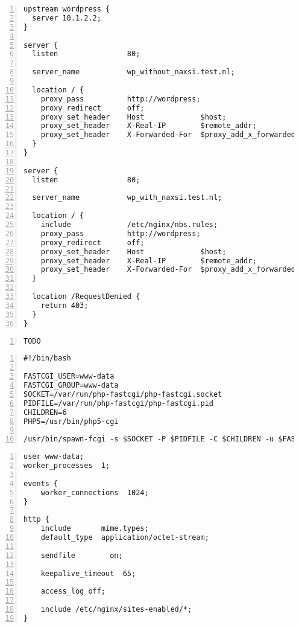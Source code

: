 \documentclass[Configuration]{subfiles}
\begin{document}
\begin{lstlisting}[frame=single,caption=/etc/nginx/sites-enabled/with\_wordpress,backgroundcolor=\color{gray},breaklines=true,numbers=left,]
upstream wordpress {
  server 10.1.2.2;
}

server {
  listen                80;

  server_name           wp_without_naxsi.test.nl;

  location / {
    proxy_pass          http://wordpress;
    proxy_redirect      off;
    proxy_set_header    Host             $host;
    proxy_set_header    X-Real-IP        $remote_addr;
    proxy_set_header    X-Forwarded-For  $proxy_add_x_forwarded_for;
  }
}

server {
  listen                80;

  server_name           wp_with_naxsi.test.nl;

  location / {
    include             /etc/nginx/nbs.rules;
    proxy_pass          http://wordpress;
    proxy_redirect      off;
    proxy_set_header    Host             $host;
    proxy_set_header    X-Real-IP        $remote_addr;
    proxy_set_header    X-Forwarded-For  $proxy_add_x_forwarded_for;
  }

  location /RequestDenied {
	return 403;
  }
}
\end{lstlisting}

\begin{lstlisting}[frame=single,caption=/etc/nginx/sites-enabled/with\_wordpress,backgroundcolor=\color{gray},breaklines=true,numbers=left,]
TODO
\end{lstlisting}

\begin{lstlisting}[frame=single,caption=/usr/bin/php-fastcgi (needs chmod +x /usr/bin/php-fastcgi),backgroundcolor=\color{gray},breaklines=true,numbers=left,]
#!/bin/bash

FASTCGI_USER=www-data
FASTCGI_GROUP=www-data
SOCKET=/var/run/php-fastcgi/php-fastcgi.socket
PIDFILE=/var/run/php-fastcgi/php-fastcgi.pid
CHILDREN=6
PHP5=/usr/bin/php5-cgi

/usr/bin/spawn-fcgi -s $SOCKET -P $PIDFILE -C $CHILDREN -u $FASTCGI_USER -g $FASTCGI_GROUP -f $PHP5
\end{lstlisting}

\begin{lstlisting}[frame=single,caption=/etc/nginx/nginx.conf,backgroundcolor=\color{gray},breaklines=true,numbers=left,]
user www-data;
worker_processes  1;

events {
    worker_connections  1024;
}

http {
    include       mime.types;
    default_type  application/octet-stream;

    sendfile        on;

    keepalive_timeout  65;

    access_log off;

    include /etc/nginx/sites-enabled/*;
}
\end{lstlisting}
\end{document}
